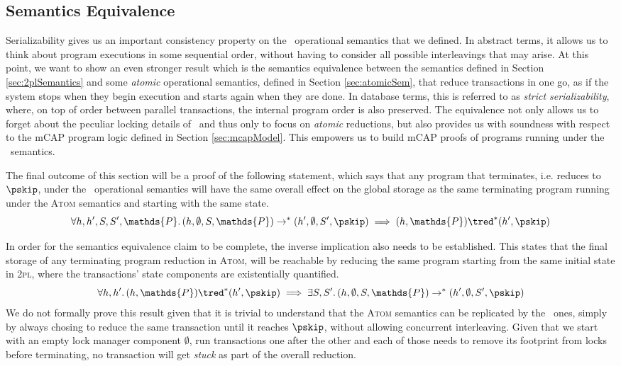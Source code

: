 \subsection{Semantics Equivalence}

\label{sec:semEquiv}

Serializability gives us an important consistency property on the \tpl\ operational semantics that we defined. In abstract terms, it allows us to think about program executions in some sequential order, without having to consider all possible interleavings that may arise. At this point, we want to show an even stronger result which is the semantics equivalence between the semantics defined in Section \ref{sec:2plSemantics} and some \textit{atomic} operational semantics, defined in Section \ref{sec:atomicSem}, that reduce transactions in one go, as if the system stops when they begin execution and starts again when they are done. In database terms, this is referred to as \textit{strict serializability}, where, on top of order between parallel transactions, the internal program order is also preserved. The equivalence not only allows us to forget about the peculiar locking details of \tpl\ and thus only to focus on \textit{atomic} reductions, but also provides us with soundness with respect to the mCAP program logic defined in Section \ref{sec:mcapModel}. This empowers us to build mCAP proofs of programs running under the \tpl\ semantics.

The final outcome of this section will be a proof of the following statement, which says that any program that terminates, i.e. reduces to $\pskip$, under the \tpl\ operational semantics will have the same overall effect on the global storage as the same terminating program running under the \textsc{Atom} semantics and starting with the same state.
\[
	\forall h, h', S, S', \mathds{P} \ldotp
	(h, \emptyset, S, \mathds{P}) \rightarrow^* (h', \emptyset, S', \pskip) \implies 
	(h, \mathds{P}) \tred^* (h', \pskip)
\]

In order for the semantics equivalence claim to be complete, the inverse implication also needs to be established. This states that the final storage of any terminating program reduction in \textsc{Atom}, will be reachable by reducing the same program starting from the same initial state in \textsc{2pl}, where the transactions' state components are existentially quantified.
\[
	\forall h, h' \ldotp
	(h, \mathds{P}) \tred^* (h', \pskip)
	\implies
	\exists S, S' \ldotp
	(h, \emptyset, S, \mathds{P}) \rightarrow^* (h', \emptyset, S', \pskip)
\]
We do not formally prove this result given that it is trivial to understand that the \textsc{Atom} semantics can be replicated by the \tpl\ ones, simply by always chosing to reduce the same transaction until it reaches $\pskip$, without allowing concurrent interleaving. Given that we start with an empty lock manager component $\emptyset$, run transactions one after the other and each of those needs to remove its footprint from locks before terminating, no transaction will get \textit{stuck} as part of the overall reduction.

